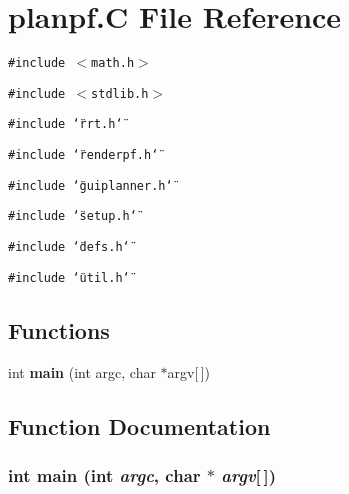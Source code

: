 \section{planpf.C File Reference}
\label{planpf_8C}
{\tt \#include $<$math.h$>$}\par
{\tt \#include $<$stdlib.h$>$}\par
{\tt \#include \char`\"{}rrt.h\char`\"{}}\par
{\tt \#include \char`\"{}renderpf.h\char`\"{}}\par
{\tt \#include \char`\"{}guiplanner.h\char`\"{}}\par
{\tt \#include \char`\"{}setup.h\char`\"{}}\par
{\tt \#include \char`\"{}defs.h\char`\"{}}\par
{\tt \#include \char`\"{}util.h\char`\"{}}\par
\subsection*{Functions}
\begin{CompactItemize}
\item 
int {\bf main} (int argc, char $\ast$argv[$\,$])
\end{CompactItemize}


\subsection{Function Documentation}
\subsubsection{\setlength{\rightskip}{0pt plus 5cm}int main (int {\em argc}, char $\ast$ {\em argv}[$\,$])}\label{planpf_8C_a0}


